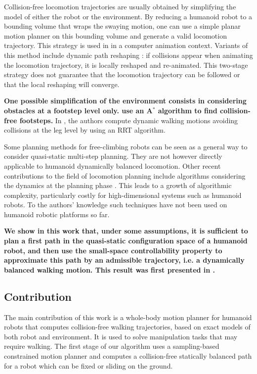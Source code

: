 \documentclass{article}
\begin{document}
Collision-free  locomotion   trajectories  are  usually   obtained  by
simplifying the model of either the  robot or the environment. By reducing 
a  humanoid robot to a bounding volume that wraps the swaying motion,
one can  use a simple  planar motion planner  on this bounding  volume and
generate  a valid  locomotion  trajectory. This  strategy  is used  in
\cite{pettre20032} in a computer animation context. Variants of this method
include  dynamic path reshaping  \cite{yoshida-humanoids05}: if  collisions appear
when animating  the locomotion  trajectory, it is  locally reshaped
and re-animated.  This two-stage  strategy does not guarantee that the
locomotion trajectory can be followed or that the local reshaping will
converge.

\textbf{One possible simplification of the environment consists in
  considering obstacles at a footstep level only.
  \cite{kuffner2001footstep,chestnutt2005footstep,kuffner2005motion}
  use an A$^{*}$ algorithm to find collision-free footsteps.}  In
\cite{perrin2012fast}, the authors compute dynamic walking motions
avoiding collisions at the leg level by using an RRT algorithm.

Some planning methods for free-climbing robots \cite{bretl2006motion}
can be seen as a general way to consider quasi-static multi-step
planning. They are not however directly applicable to humanoid
dynamically balanced locomotion.  Other recent contributions to the
field of locomotion planning include algorithms considering the
dynamics at the planning phase \cite{shkolnik2011bounding}. This leads
to a growth of algorithmic complexity, particularly costly for
high-dimensional systems such as humanoid robots. To the authors'
knowledge such techniques have not been used on humanoid robotic
platforms so far.

\textbf{We show in this work that, under some assumptions, it is
  sufficient to plan a first path in the quasi-static configuration
  space of a humanoid robot, and then use the small-space
  controllability property to approximate this path by an admissible
  trajectory, i.e. a dynamically balanced walking motion. This result
  was first presented in \cite{dalibard2011small}.}

\subsection{Contribution}

The main contribution of this work is a whole-body motion planner for
humanoid robots that computes collision-free walking trajectories,
based on exact models of both robot and environment. It is used to
solve manipulation tasks that may require walking. The first stage of
our algorithm uses a sampling-based constrained motion planner and
computes a collision-free statically balanced path for a robot which
can be fixed or sliding on the ground.
\end{document}
